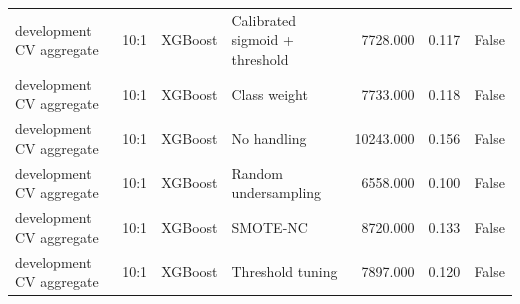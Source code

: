 \begin{tabular}{llllrrr}
development CV aggregate & 10:1 & XGBoost & Calibrated sigmoid + threshold & 7728.000 & 0.117 & False \\
development CV aggregate & 10:1 & XGBoost & Class weight & 7733.000 & 0.118 & False \\
development CV aggregate & 10:1 & XGBoost & No handling & 10243.000 & 0.156 & False \\
development CV aggregate & 10:1 & XGBoost & Random undersampling & 6558.000 & 0.100 & False \\
development CV aggregate & 10:1 & XGBoost & SMOTE-NC & 8720.000 & 0.133 & False \\
development CV aggregate & 10:1 & XGBoost & Threshold tuning & 7897.000 & 0.120 & False \\
\bottomrule
\end{tabular}
